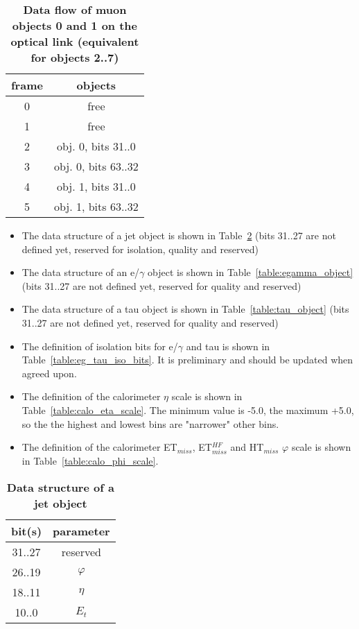 \documentclass{cmspaper}
\begin{document}
\begin{table}[htdp]
\caption{\bf Data flow of muon objects 0 and 1 on the optical link \rm(equivalent for objects 2..7)}
\vspace{5mm}
\centering
\begin{tabular}{|c|c|}\hline
frame & objects\\\hline\hline
0 & free \\\hline
1 & free \\\hline
2 & obj. 0, bits 31..0\\\hline
3 & obj. 0, bits 63..32 \\\hline
4 & obj. 1, bits 31..0 \\\hline
5 & obj. 1, bits 63..32 \\\hline
\end{tabular}
\label{table:opt_link_muon_obj_0_1}
\end{table}

\clearpage

\begin{itemize}
\item The data structure of a jet object is shown in Table~\ref{table:jet_object} (bits 31..27 are not defined yet, reserved for isolation, quality and reserved)
\item The data structure of an e/$\gamma$ object is shown in Table~\ref{table:egamma_object} (bits 31..27 are not defined yet, reserved for quality and reserved)
\item The data structure of a tau object is shown in Table~\ref{table:tau_object} (bits 31..27 are not defined yet, reserved for quality and reserved)
\item The definition of isolation bits for e/$\gamma$ and tau is shown in Table~\ref{table:eg_tau_iso_bits}. It is preliminary and should be updated when agreed upon. 
\item The definition of the calorimeter $\eta$ scale is shown in Table~\ref{table:calo_eta_scale}. The minimum value is -5.0, the maximum +5.0, so the the highest and lowest
bins are "narrower" other bins.
\item The definition of the calorimeter ET$_{miss}$, ET$_{miss}^{HF}$ and HT$_{miss}$ $\varphi$ scale is shown in Table~\ref{table:calo_phi_scale}.
\end{itemize}

\begin{table}[ht]
\caption{\bf Data structure of a jet object}
\vspace{5mm}
\centering
\begin{tabular}{|c|c|}\hline
bit(s) & parameter \\\hline\hline
31..27 & reserved \\
26..19 & $\varphi$ \\
18..11 & $\eta$ \\
10..0 & $E_t$ \\\hline
\end{tabular}
\label{table:jet_object}
\end{table}
\end{document}
